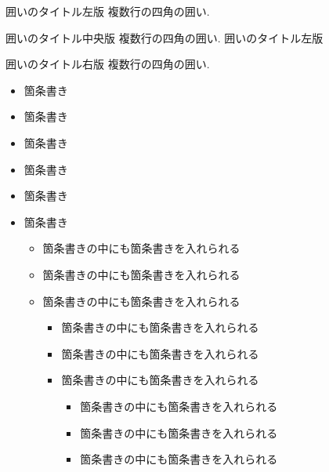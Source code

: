 \documentclass{jsarticle}
\begin{document}
    \fi



    \begin{itembox}[l]{囲いのタイトル左版}
        複数行の四角の囲い.
    \end{itembox}

    \begin{itembox}[c]{囲いのタイトル中央版}
        複数行の四角の囲い. 囲いのタイトル左版
    \end{itembox}

    \begin{itembox}[r]{囲いのタイトル右版}
        複数行の四角の囲い.
    \end{itembox}

    \newpage

    \begin{itemize}
        \item 箇条書き
        \item 箇条書き
        \item 箇条書き
    \end{itemize}

    \begin{itemize}
        \item 箇条書き
        \item 箇条書き
        \item 箇条書き

        \begin{itemize}
            \item 箇条書きの中にも箇条書きを入れられる
            \item 箇条書きの中にも箇条書きを入れられる
            \item 箇条書きの中にも箇条書きを入れられる

            \begin{itemize}
                \item 箇条書きの中にも箇条書きを入れられる
                \item 箇条書きの中にも箇条書きを入れられる
                \item 箇条書きの中にも箇条書きを入れられる

                \begin{itemize}
                    \item 箇条書きの中にも箇条書きを入れられる
                    \item 箇条書きの中にも箇条書きを入れられる
                    \item 箇条書きの中にも箇条書きを入れられる
                \end{itemize}

            \end{itemize}

        \end{itemize}

    \end{itemize}
\end{document}
